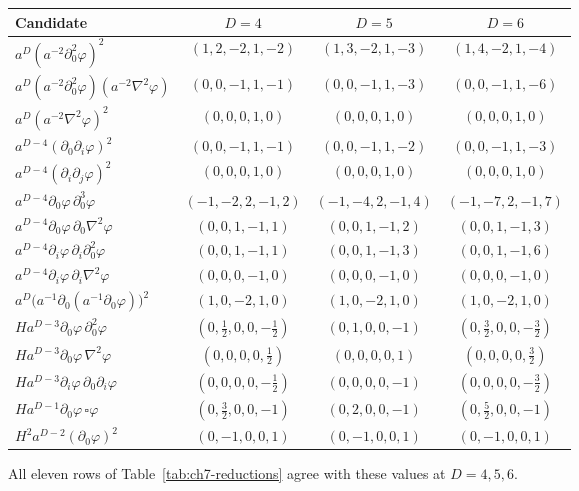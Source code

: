 \begin{center}
\small
\renewcommand{\arraystretch}{1.15}
\begin{tabular}{@{}lccc@{}}
\toprule
Candidate & $D=4$ & $D=5$ & $D=6$\\
\midrule
$a^D(a^{-2}\partial_0^2\varphi)^2$ & $(1,2,-2,1,-2)$ & $(1,3,-2,1,-3)$ & $(1,4,-2,1,-4)$\\
$a^D(a^{-2}\partial_0^2\varphi)(a^{-2}\nabla^2\varphi)$ & $(0,0,-1,1,-1)$ & $(0,0,-1,1,-3)$ & $(0,0,-1,1,-6)$\\
$a^D(a^{-2}\nabla^2\varphi)^2$ & $(0,0,0,1,0)$ & $(0,0,0,1,0)$ & $(0,0,0,1,0)$\\
$a^{D-4}(\partial_0\partial_i\varphi)^2$ & $(0,0,-1,1,-1)$ & $(0,0,-1,1,-2)$ & $(0,0,-1,1,-3)$\\
$a^{D-4}(\partial_i\partial_j\varphi)^2$ & $(0,0,0,1,0)$ & $(0,0,0,1,0)$ & $(0,0,0,1,0)$\\
$a^{D-4}\partial_0\varphi\,\partial_0^3\varphi$ & $(-1,-2,2,-1,2)$ & $(-1,-4,2,-1,4)$ & $(-1,-7,2,-1,7)$\\
$a^{D-4}\partial_0\varphi\,\partial_0\nabla^2\varphi$ & $(0,0,1,-1,1)$ & $(0,0,1,-1,2)$ & $(0,0,1,-1,3)$\\
$a^{D-4}\partial_i\varphi\,\partial_i\partial_0^2\varphi$ & $(0,0,1,-1,1)$ & $(0,0,1,-1,3)$ & $(0,0,1,-1,6)$\\
$a^{D-4}\partial_i\varphi\,\partial_i\nabla^2\varphi$ & $(0,0,0,-1,0)$ & $(0,0,0,-1,0)$ & $(0,0,0,-1,0)$\\
$a^D\big(a^{-1}\partial_0(a^{-1}\partial_0\varphi)\big)^2$ & $(1,0,-2,1,0)$ & $(1,0,-2,1,0)$ & $(1,0,-2,1,0)$\\
$Ha^{D-3}\partial_0\varphi\,\partial_0^2\varphi$ & $(0,\tfrac12,0,0,-\tfrac12)$ & $(0,1,0,0,-1)$ & $(0,\tfrac32,0,0,-\tfrac32)$\\
$Ha^{D-3}\partial_0\varphi\,\nabla^2\varphi$ & $(0,0,0,0,\tfrac12)$ & $(0,0,0,0,1)$ & $(0,0,0,0,\tfrac32)$\\
$Ha^{D-3}\partial_i\varphi\,\partial_0\partial_i\varphi$ & $(0,0,0,0,-\tfrac12)$ & $(0,0,0,0,-1)$ & $(0,0,0,0,-\tfrac32)$\\
$Ha^{D-1}\partial_0\varphi\,\square\varphi$ & $(0,\tfrac32,0,0,-1)$ & $(0,2,0,0,-1)$ & $(0,\tfrac52,0,0,-1)$\\
$H^2a^{D-2}(\partial_0\varphi)^2$ & $(0,-1,0,0,1)$ & $(0,-1,0,0,1)$ & $(0,-1,0,0,1)$\\
\bottomrule
\end{tabular}
\end{center}
All eleven rows of Table~\ref{tab:ch7-reductions} agree with these values at $D=4,5,6$.

